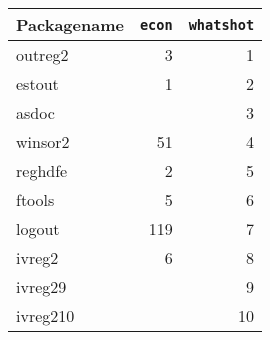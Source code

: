 \begin{tabular}{lrr}\toprule
Packagename&\texttt{econ}&\texttt{whatshot}\\\midrule
outreg2&3&1\\
estout&1&2\\
asdoc&&3\\
winsor2&51&4\\
reghdfe&2&5\\
ftools&5&6\\
logout&119&7\\
ivreg2&6&8\\
ivreg29&&9\\
ivreg210&&10\\
\bottomrule\end{tabular}
